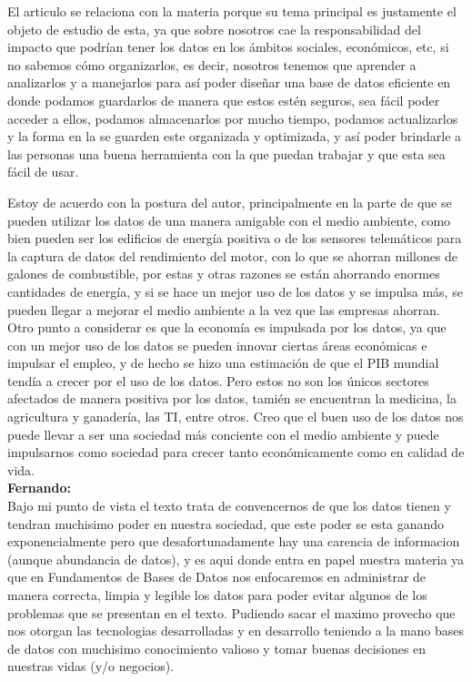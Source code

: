 \documentclass[12pt,a4paper]{article}
\begin{document}
\begin{enumerate}
\begin{enumerate}
				El articulo se relaciona con la materia porque su tema principal es 
				justamente el objeto de estudio de esta, ya que sobre nosotros 
				cae la responsabilidad del impacto que podrían tener los datos en los 
				ámbitos sociales, económicos, etc, si no sabemos cómo organizarlos, es decir,
				nosotros tenemos que aprender a analizarlos y a manejarlos para así poder 
				diseñar una base de datos eficiente en donde podamos guardarlos de manera que 
				estos estén seguros, sea fácil poder acceder a ellos, podamos almacenarlos por 
				mucho tiempo, podamos actualizarlos y la forma en la se guarden este organizada 
				y optimizada, y así poder brindarle a las personas una buena herramienta con la 
				que puedan trabajar y que esta sea fácil de usar.
				
				Estoy de acuerdo con la postura del autor, principalmente en la parte de que 
				se pueden utilizar los datos de una manera amigable con el medio ambiente, 
				como bien pueden ser los edificios de energía positiva o de los sensores 
				telemáticos para la captura de datos del rendimiento del motor, con lo que se 
				ahorran millones de galones de combustible, por estas y otras razones se están 
				ahorrando enormes cantidades de energía, y si se hace un mejor uso de los datos 
				y se impulsa más, se pueden llegar a mejorar el medio ambiente a la vez que las 
				empresas ahorran. Otro punto a considerar es que la economía es impulsada por los 
				datos, ya que con un mejor uso de los datos se pueden innovar ciertas áreas 
				económicas e impulsar el empleo, y de hecho se hizo una estimación de que el 
				PIB mundial tendía a crecer por el uso de los datos.
				Pero estos no son los únicos sectores afectados de manera positiva por los datos, 
				tamién se encuentran la medicina, la agricultura y ganadería, las TI, entre otros.
				Creo que el buen uso de los datos nos puede llevar a ser una sociedad más conciente
				con el medio ambiente y puede impulsarnos como sociedad para crecer tanto económicamente 
				como en calidad de vida.\\

				\textbf{Fernando:}\\
				Bajo mi punto de vista el texto trata de convencernos de que los datos tienen y tendran muchisimo poder en nuestra 
				sociedad, que este poder se esta ganando exponencialmente pero que desafortunadamente hay una carencia de informacion 
				(aunque abundancia de datos), y es aqui donde entra en papel nuestra materia ya que en Fundamentos de Bases de Datos nos
				enfocaremos en administrar de manera correcta, limpia y legible los datos para poder evitar algunos de los problemas que
				se presentan en el texto. Pudiendo sacar el maximo provecho que nos otorgan las tecnologias desarrolladas y en desarrollo 
				teniendo a la mano bases de datos con muchisimo conocimiento valioso y tomar buenas decisiones en nuestras vidas (y/o 
				negocios).


\end{enumerate}
\end{enumerate}
\end{document}
